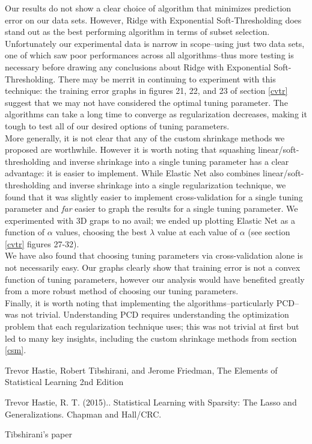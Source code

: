 \documentclass[11pt]{article}
\begin{document}
Our results do not show a clear choice of algorithm that minimizes prediction error on our data sets.  However, Ridge with Exponential Soft-Thresholding does stand out as the best performing algorithm in terms of subset selection.  Unfortunately our experimental data is narrow in scope--using just two data sets, one of which saw poor performances across all algorithms--thus more testing is necessary before drawing any conclusions about Ridge with Exponential Soft-Thresholding.  There may be merrit in continuing to experiment with this technique: the training error graphs in figures 21, 22, and 23 of section \ref{cvtr} suggest that we may not have considered the optimal tuning parameter.  The algorithms can take a long time to converge as regularization decreases, making it tough to test all of our desired options of tuning parameters.  \\

More generally, it is not clear that any of the custom shrinkage methods we proposed are worthwhile.  However it is worth noting that squashing linear/soft-thresholding and inverse shrinkage into a single tuning parameter has a clear advantage: it is easier to implement.  While Elastic Net also combines linear/soft-thresholding and inverse shrinkage into a single regularization technique, we found that it was slightly easier to implement cross-validation for a single tuning parameter and \textit{far} easier to graph the results for a single tuning parameter.  We experimented with 3D graps to no avail; we ended up plotting Elastic Net as a function of $\alpha$ values, choosing the best $\lambda$ value at each value of $\alpha$ (see section \ref{cvtr} figures 27-32).  \\

We have also found that choosing tuning parameters via cross-validation alone is not necessarily easy.  Our graphs clearly show that training error is not a convex function of tuning parameters, however our analysis would have benefited greatly from a more robust method of choosing our tuning parameters.  \\

Finally, it is worth noting that implementing the algorithms--particularly PCD--was not trivial.  Understanding PCD requires understanding the optimization problem that each regularization technique uses; this was not trivial at first but led to many key insights, including the custom shrinkage methods from section \ref{csm}.  


\begin{thebibliography}{9}
Trevor Hastie, Robert Tibshirani, and Jerome Friedman,
The Elements of Statistical Learning 2nd Edition

Trevor Hastie, R. T. (2015)..  Statistical Learning with Sparsity: The Lasso and Generalizations.
Chapman and Hall/CRC.


Tibshirani's paper
\end{thebibliography}
\end{document}
